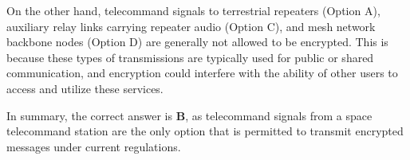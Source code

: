 On the other hand, telecommand signals to terrestrial repeaters (Option A), auxiliary relay links carrying repeater audio (Option C), and mesh network backbone nodes (Option D) are generally not allowed to be encrypted. This is because these types of transmissions are typically used for public or shared communication, and encryption could interfere with the ability of other users to access and utilize these services.

In summary, the correct answer is \textbf{B}, as telecommand signals from a space telecommand station are the only option that is permitted to transmit encrypted messages under current regulations.

